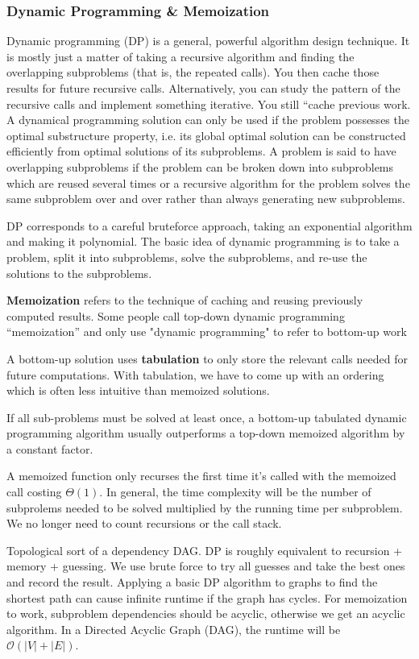 \documentclass{article}
\newcommand{\bigO}{\ensuremath{\mathcal{O}}}
\begin{document}
    \subsubsection{Dynamic Programming \& Memoization}
    Dynamic programming (DP) is a general, powerful algorithm design technique. It is mostly just a matter of taking a recursive algorithm and finding the overlapping subproblems (that is, the repeated calls). You then cache those results for future recursive calls. Alternatively, you can study the pattern of the recursive calls and implement something iterative. You still ``cache previous work. A dynamical programming solution can only be used if the problem possesses the optimal substructure property, i.e. its global optimal solution can be constructed efficiently from optimal solutions of its subproblems. A problem is said to have overlapping subproblems if the problem can be broken down into subproblems which are reused several times or a recursive algorithm for the problem solves the same subproblem over and over rather than always generating new subproblems.

    DP corresponds to a careful bruteforce approach, taking an exponential algorithm and making it polynomial. The basic idea of dynamic programming is to take a problem, split it into subproblems, solve the subproblems, and re-use the solutions to the subproblems.

    \textbf{Memoization} refers to the technique of caching and reusing previously computed results. Some people call top-down dynamic programming ``memoization'' and only use "dynamic programming" to refer to bottom-up work
    
    A bottom-up solution uses \textbf{tabulation} to only store the relevant calls needed for future computations. With tabulation, we have to come up with an ordering which is often less intuitive than memoized solutions.
    
    If all sub-problems must be solved at least once, a bottom-up tabulated dynamic programming algorithm usually outperforms a top-down memoized algorithm by a constant factor.

    A memoized function only recurses the first time it's called with the memoized call costing $\Theta(1)$. In general, the time complexity will be the number of subprolems needed to be solved multiplied by the running time per subproblem. We no longer need to count recursions or the call stack.
    
    Topological sort of a dependency DAG. DP is roughly equivalent to recursion + memory + guessing. We use brute force to try all guesses and take the best ones and record the result. Applying a basic DP algorithm to graphs to find the shortest path can cause infinite runtime if the graph has cycles. For memoization to work, subproblem dependencies should be acyclic, otherwise we get an acyclic algorithm. In a Directed Acyclic Graph (DAG), the runtime will be $\bigO(|V|+|E|)$. 
    
\end{document}
